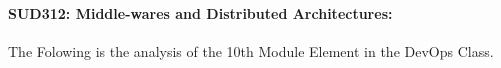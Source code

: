 \documentclass[12pt]{extreport}
\begin{document}
\begin{comment}
\subparagraph{Interpretation of the Box-plots:}
For This Element 

\begin{enumerate}	
	\item The MP Class Box-Plot:
	\begin{enumerate}
		\item MAX = a {} {} {} {} {} {} {} {} UQ = b {} {} {} {} {} {} {} {} Median = c
		\item LQ = d {} {} {} {} {} {} {} {}  MIN =	l {} {} {} {} {} {} {} {}  IQR = e - f = g
	\end{enumerate}
	\item The PSI Class Box-Plot:
	\begin{enumerate}
		\item MAX = a {} {} {} {} {} {} {} {} UQ = b {} {} {} {} {} {} {} {} Median = c
		\item LQ = d {} {} {} {} {} {} {} {}  MIN =	e {} {} {} {} {} {} {} {} IQR = f - g = h	
	\end{enumerate}
	\item The TSI Class Box-Plot:
	\begin{enumerate}
		\item MAX = a {} {} {} {} {} {} {} {} UQ = b {} {} {} {} {} {} {} {} Median = c
		\item LQ = d {} {} {} {} {} {} {} {} MIN = e {} {} {} {} {} {} {} {} IQR = f - g = h	
	\end{enumerate}
\end{enumerate}



\subparagraph{Interpretation of the histogram:}
This Frequency Distribution is (Skeness) with the following descriptive statistics:
\begin{enumerate}
	\item Mean = 
	\item STD = 
	\item Range = a - b = c
	\item IQR = a-b = c 
\end{enumerate}
\end{comment}



\paragraph{\large SUD312: Middle-wares and Distributed Architectures:\\
}
The Folowing is the analysis of the 10th Module Element in the DevOps Class.  
\end{document}
